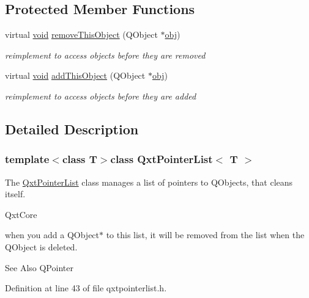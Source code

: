 \subsection*{Protected Member Functions}
\begin{DoxyCompactItemize}
\item 
virtual \hyperlink{group___u_a_v_objects_plugin_ga444cf2ff3f0ecbe028adce838d373f5c}{void} \hyperlink{class_qxt_pointer_list_a4b925e3e159629e876f4a35628a6be3c}{remove\-This\-Object} (Q\-Object $\ast$\hyperlink{glext_8h_a0c0d4701a6c89f4f7f0640715d27ab26}{obj})
\begin{DoxyCompactList}\small\item\em reimplement to access objects before they are removed \end{DoxyCompactList}\item 
virtual \hyperlink{group___u_a_v_objects_plugin_ga444cf2ff3f0ecbe028adce838d373f5c}{void} \hyperlink{class_qxt_pointer_list_a3dd2eccc32e990a3590a8402763d5f22}{add\-This\-Object} (Q\-Object $\ast$\hyperlink{glext_8h_a0c0d4701a6c89f4f7f0640715d27ab26}{obj})
\begin{DoxyCompactList}\small\item\em reimplement to access objects before they are added \end{DoxyCompactList}\end{DoxyCompactItemize}


\subsection{Detailed Description}
\subsubsection*{template$<$class T$>$class Qxt\-Pointer\-List$<$ T $>$}

The \hyperlink{class_qxt_pointer_list}{Qxt\-Pointer\-List} class manages a list of pointers to Q\-Objects, that cleans itself. 

Qxt\-Core

when you add a Q\-Object$\ast$ to this list, it will be removed from the list when the Q\-Object is deleted.

\begin{DoxySeeAlso}{See Also}
Q\-Pointer 
\end{DoxySeeAlso}


Definition at line 43 of file qxtpointerlist.\-h.



